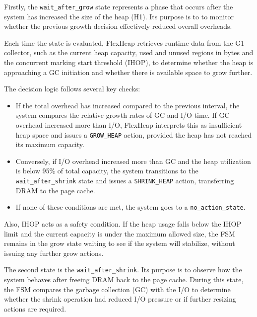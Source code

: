 Firstly, the \texttt{wait\_after\_grow} state represents a phase that occurs after 
the system has increased the size of the heap (H1). Its purpose is to 
to monitor whether the previous growth decision effectively 
reduced overall overheads. 

Each time the state is evaluated, FlexHeap retrieves runtime data from the G1 collector, 
such as the current heap capacity, used and unused regions in bytes and the concurrent marking 
start threshold (IHOP), to determine whether the heap is approaching 
a GC initiation and whether there is available space to grow further.

The decision logic follows several key checks:
\begin{itemize}
  \item If the total overhead has increased compared to the previous interval, the system
    compares the relative growth rates of GC and I/O time. If GC overhead increased more than I/O, 
    FlexHeap interprets this as insufficient heap space and issues a \texttt{GROW\_HEAP} action, 
    provided the heap has not reached its maximum capacity. 
  \item Conversely, if I/O overhead increased more than GC and the heap utilization is below 95\% of
    total capacity, the system transitions to the \texttt{wait\_after\_shrink} state and issues a 
    \texttt{SHRINK\_HEAP} action, transferring DRAM to the page cache.
  \item If none of these conditions are met, the system goes to a \texttt{no\_action\_state}.
\end{itemize}

Also, IHOP acts as a safety condition. If the heap usage falls below the 
IHOP limit and the current capacity is under the maximum allowed size, the FSM remains in the 
grow state waiting to see if the system will stabilize, without issuing any further grow actions.

The second state is the \texttt{wait\_after\_shrink}. Its purpose is to 
observe how the system behaves after freeing DRAM back to the page cache. During this
state, the FSM compares the garbage collection (GC) with the I/O to determine whether
the shrink operation had reduced I/O pressure or if further resizing actions are required.

